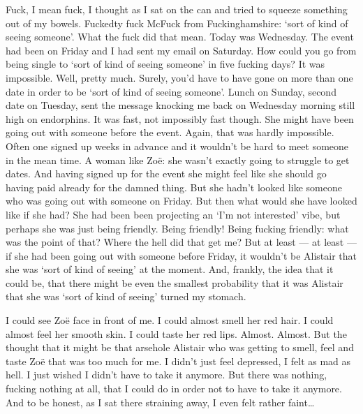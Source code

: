 Fuck, I mean fuck, I thought as I sat on the can and tried to
squeeze something out of my bowels. Fuckedty fuck McFuck from
Fuckinghamshire: `sort of kind of seeing someone'. What the fuck did
that mean. Today was Wednesday. The event had been on Friday and I
had sent my email on Saturday. How could you go from being single to
`sort of kind of seeing someone' in five fucking days? It was
impossible. Well, pretty much. Surely, you'd have to have gone on
more than one date in order to be `sort of kind of seeing someone'.
Lunch on Sunday, second date on Tuesday, sent the message knocking
me back on Wednesday morning still high on endorphins. It was fast,
not impossibly fast though. She might have been going out with
someone before the event. Again, that was hardly impossible. Often
one signed up weeks in advance and it wouldn't be hard to meet
someone in the mean time. A woman like Zoë: she wasn't exactly
going to struggle to get dates. And having signed up for the event
she might feel like she should go having paid already for the damned
thing. But she hadn't looked like someone who was going out with
someone on Friday. But then what would she have looked like if she
had? She had been been projecting an `I'm not interested' vibe, but
perhaps she was just being friendly. Being friendly! Being fucking
friendly: what was the point of that? Where the hell did that get
{\twelveit me\/}? But at least --- {\twelveit at least} --- if she
had been going out with someone before Friday, it wouldn't be
Alistair that she was `sort of kind of seeing' at the moment. And,
frankly, the idea that it could be, that there might be even the
smallest probability that it was Alistair that she was `sort of kind
of seeing' turned my stomach.

I could see Zoë face in front of me. I could almost smell her
red hair. I could almost feel her smooth skin. I could taste her red
lips. Almost. Almost. But the thought that it might be that arsehole
Alistair who was getting to smell, feel and taste Zoë that was
too much for me. I didn't just feel depressed, I felt as mad as
hell. I just wished I didn't have to take it anymore. But there was
nothing, fucking nothing at all, that I could do in order not to
have to take it anymore. And to be honest, as I sat there straining
away, I even felt rather faint\dots

